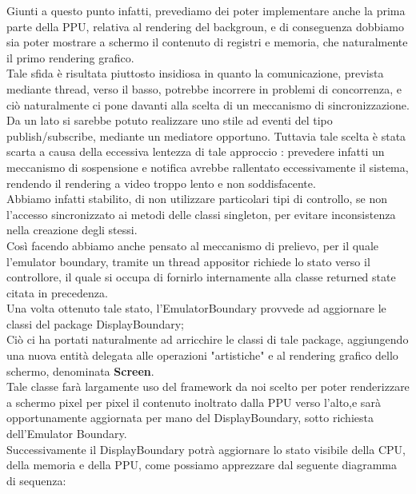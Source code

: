 \documentclass[11pt]{article}
\begin{document}
Giunti a questo punto infatti, prevediamo dei poter implementare anche la prima parte della PPU, relativa al rendering del backgroun, e di conseguenza dobbiamo sia poter mostrare a schermo il contenuto di registri e memoria, che naturalmente il primo rendering grafico.\\

Tale sfida è risultata piuttosto insidiosa in quanto la comunicazione, prevista mediante thread, verso il basso, potrebbe incorrere in problemi di concorrenza, e ciò naturalmente ci pone davanti alla scelta di un meccanismo di sincronizzazione.\\
Da un lato si sarebbe potuto realizzare uno stile ad eventi del tipo publish/subscribe, mediante un mediatore opportuno. Tuttavia tale scelta è stata scarta a causa della eccessiva lentezza di tale approccio : prevedere infatti un meccanismo di sospensione e notifica avrebbe rallentato eccessivamente il sistema, rendendo il rendering a video troppo lento e non soddisfacente.\\

Abbiamo infatti stabilito, di non utilizzare particolari tipi di controllo, se non l'accesso sincronizzato ai metodi delle classi singleton, per evitare inconsistenza nella creazione degli stessi.\\
Così facendo abbiamo anche pensato al meccanismo di prelievo, per il quale l'emulator boundary, tramite un thread appositor richiede lo stato verso il controllore, il quale si occupa di fornirlo internamente alla classe returned state citata in precedenza.\\

Una volta ottenuto tale stato, l'EmulatorBoundary provvede ad aggiornare le classi del package DisplayBoundary; \\
Ciò ci ha portati naturalmente ad arricchire le classi di tale package, aggiungendo una nuova entità delegata alle operazioni "artistiche" e al rendering grafico dello schermo, denominata \textbf{Screen}.\\
Tale classe farà largamente uso del framework da noi scelto per poter renderizzare a schermo pixel per pixel il contenuto inoltrato dalla PPU verso l'alto,e sarà opportunamente aggiornata per mano del DisplayBoundary, sotto richiesta dell'Emulator Boundary.\\

Successivamente il DisplayBoundary potrà aggiornare lo stato visibile della CPU, della memoria e della PPU, come possiamo apprezzare dal seguente diagramma di sequenza:
\end{document}
